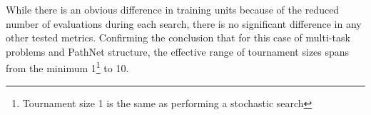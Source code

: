 While there is an obvious difference in training units because of the reduced number of evaluations during each search, there is no significant difference in any other tested metrics. Confirming the conclusion that for this case of multi-task problems and PathNet structure, the effective range of tournament sizes spans from the minimum 1\footnote{Tournament size 1 is the same as performing a stochastic search} to 10.